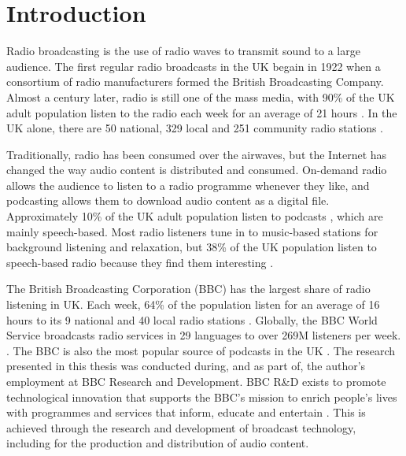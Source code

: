 \chapter{Introduction}\label{chp:intro}

Radio broadcasting is the use of radio waves to transmit sound to a large audience.  The first regular radio broadcasts
in the UK begain in 1922 when a consortium of radio manufacturers formed the British Broadcasting Company.
Almost a century later, radio is still one of the mass media, with 90\% of the UK adult population listen to the
radio each week for an average of 21 hours \citep{RAJAR2017a}.  In the UK alone, there are 50 national, 329 local and
251 community radio stations \citep[pp. 6, 127]{Ofcom2017}.

Traditionally, radio has been consumed over the airwaves, but the Internet has changed the way audio content is
distributed and consumed.  On-demand radio allows the audience to listen to a radio programme whenever they like, and
podcasting allows them to download audio content as a digital file.  Approximately 10\% of the UK adult population
listen to podcasts \citep{RAJAR2017}, which are mainly speech-based.  Most radio listeners tune in to music-based
stations for background listening and relaxation, but 38\% of the UK population listen to speech-based radio because
they find them interesting \citep[pp.  97, 105]{Ofcom2017}.

The British Broadcasting Corporation (BBC) has the largest share of radio listening in UK. Each week, 64\% of the
population listen for an average of 16 hours to its 9 national and 40 local radio stations \citep{RAJAR2017a}.
Globally, the BBC World Service broadcasts radio services in 29 languages to over 269M listeners per week. 
\citep{BBC2017}. The BBC is also the most popular source of podcasts in the UK \citep[p. 107]{Ofcom2017}.
The research presented in this thesis was conducted during, and as part of, the author's employment at BBC Research and
Development.  BBC R\&D exists to promote technological innovation that supports the BBC's mission to enrich people's
lives with programmes and services that inform, educate and entertain \citep[art. 15]{BBCCharter2016}.  This is
achieved through the research and development of broadcast technology, including for the production and distribution of
audio content.

